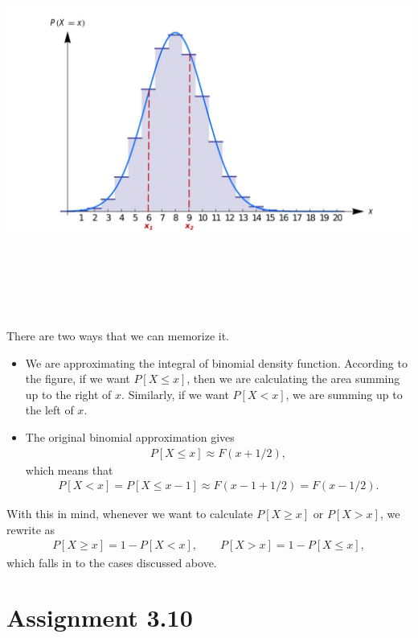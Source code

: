 \begin{minipage}{0.7\linewidth}
	\centering
	\includegraphics[width=\linewidth]{./images/s4fig1.pdf}
\end{minipage}\\
~\\
~\\
 \\
~\\
There are two ways that we can memorize it.
\begin{itemize}
	\item We are approximating the integral of binomial density function. According to the figure, if we want $P[X \leq x]$, then we are calculating the area summing up to the right of $x$. Similarly, if we want $P[X < x]$, we are summing up to the left of $x$.
	\item The original binomial approximation gives
	\begin{align*}
	P[X\leq x] \approx F(x + 1/2),
	\end{align*}
	which means that
	\begin{align*}
	P[X < x] = P[X\leq x - 1] \approx F(x - 1 + 1/2) = F(x - 1/2).
	\end{align*}
\end{itemize}
With this in mind, whenever we want to calculate $P[X\geq x]$ or $P[X > x]$, we rewrite as
\begin{align*}
P[X \geq x] = 1 - P[X < x], \qquad P[X > x] = 1 - P[X\leq x],
\end{align*}
which falls in to the cases discussed above.


\section*{Assignment 3.10}

